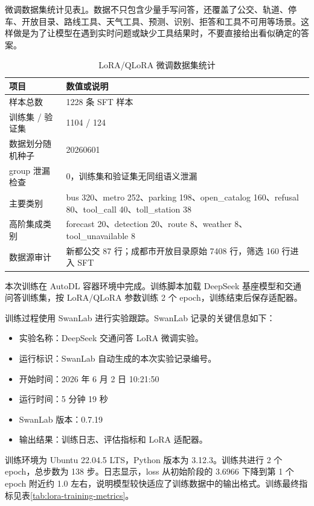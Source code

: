 \documentclass[bwprint]{report}
\begin{document}
微调数据集统计见表\ref{tab:sft-stats}。数据不只包含少量手写问答，还覆盖了公交、轨道、停车、开放目录、路线工具、天气工具、预测、识别、拒答和工具不可用等场景。这样做是为了让模型在遇到实时问题或缺少工具结果时，不要直接给出看似确定的答案。

\begin{table}[H]
    \caption{LoRA/QLoRA 微调数据集统计}
    \label{tab:sft-stats}
    \centering
    \small
    \begin{tabular}{p{}p{}}
        \toprule[1.5pt]
        项目 & 数值或说明 \\
        \midrule[1pt]
        样本总数 & 1228 条 SFT 样本 \\
        训练集 / 验证集 & 1104 / 124 \\
        数据划分随机种子 & 20260601 \\
        group 泄漏检查 & 0，训练集和验证集无同组语义泄漏 \\
        主要类别 & bus 320、metro 252、parking 198、open\_catalog 160、refusal 80、tool\_call 40、toll\_station 38 \\
        高阶集成类别 & forecast 20、detection 20、route 8、weather 8、tool\_unavailable 8 \\
        数据源审计 & 新都公交 87 行；成都市开放目录原始 7408 行，筛选 160 行进入 SFT \\
        \bottomrule[1.5pt]
    \end{tabular}
\end{table}

本次训练在 AutoDL 容器环境中完成。训练脚本加载 DeepSeek 基座模型和交通问答训练集，按 LoRA/QLoRA 参数训练 2 个 epoch，训练结束后保存适配器。

训练过程使用 SwanLab 进行实验跟踪。SwanLab 记录的关键信息如下：
\begin{itemize}
    \item 实验名称：DeepSeek 交通问答 LoRA 微调实验。
    \item 运行标识：SwanLab 自动生成的本次实验记录编号。
    \item 开始时间：2026 年 6 月 2 日 10:21:50
    \item 运行时间：5 分钟 19 秒
    \item SwanLab 版本：0.7.19
    \item 输出结果：训练日志、评估指标和 LoRA 适配器。
\end{itemize}

训练环境为 Ubuntu 22.04.5 LTS，Python 版本为 3.12.3。训练共进行 2 个 epoch，总步数为 138 步。日志显示，loss 从初始阶段的 3.6966 下降到第 1 个 epoch 附近约 1.0 左右，说明模型较快适应了训练数据中的输出格式。训练最终指标见表\ref{tab:lora-training-metrics}。
\end{document}

